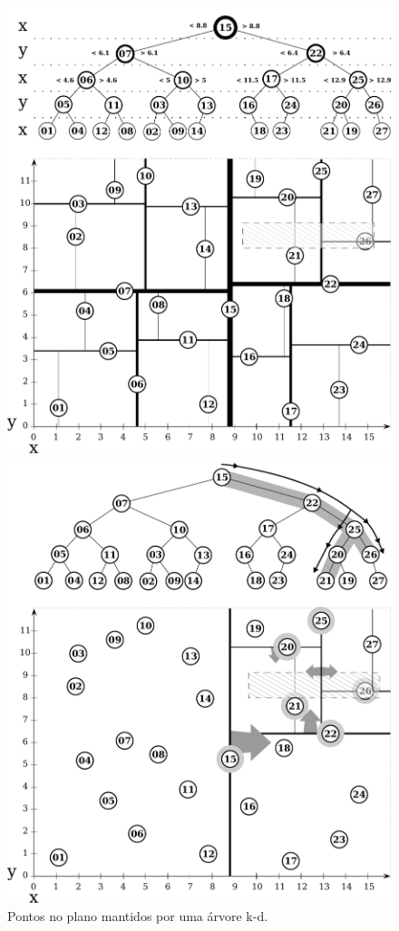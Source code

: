 \begin{figure}[ht]
  \centering
  \begin{minipage}[t]{0.48\textwidth}
    \includegraphics[width=\textwidth]{img/points-query/kdt/points-kdt-model}
    \caption{Pontos no plano mantidos por uma árvore k-d.}
    \label{img:pts-kdt-model}
  \end{minipage}
  \hfill
  \begin{minipage}[t]{0.48\textwidth}
    \includegraphics[width=\textwidth]{img/points-query/kdt/points-kdt-query}

\end{minipage}
\end{figure}
